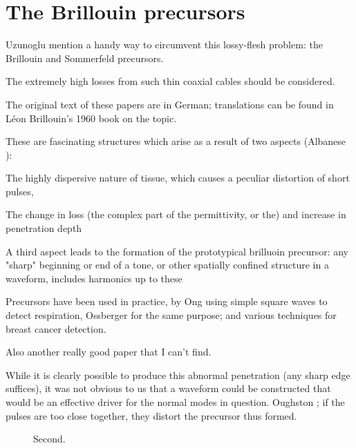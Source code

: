\documentclass[paper.tex]{subfiles}
\begin{document}
\pagebreak
\section{The Brillouin precursors}

Uzunoglu \cite{Theoretical2020} mention a handy way to circumvent this lossy-flesh problem: the Brillouin and Sommerfeld precursors.


The extremely high losses from such thin coaxial cables should be considered.

The original text of these papers are in German; translations can be found in Léon Brillouin's 1960 
book\cite{Wave1960} on the topic. \footnotemark

These are fascinating structures which arise as a result of two aspects (Albanese 
\cite{Shortrisetime1989}): 

The highly dispersive nature of tissue, which causes a peculiar distortion of short pulses,

The change in loss (the complex part of the permittivity, or the) and increase in penetration depth 

A third aspect leads to the formation of the prototypical brilluoin precursor: any "sharp" 
beginning or end of a tone, or other spatially confined structure in a waveform, includes harmonics 
up to these \footnotemark


Precursors have been used in practice, by Ong \cite{Detection2003} using simple square waves to detect respiration\footnotemark, Ossberger \cite{Noninvasive2004} for the same purpose; and various techniques for breast cancer detection.


Also another really good paper that I can't find.





While it is clearly possible to produce this abnormal penetration (any sharp edge suffices), it was not obvious to us that a waveform 
could be constructed that would be an effective driver for the normal modes in question. 
Oughston ; if the pulses are too close together, they distort the precursor thus formed.





\begin{figure}[H]
		
	\caption{Second.}
\end{figure}
\end{document}
